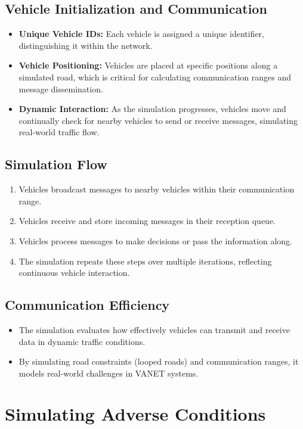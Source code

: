 \subsection{Vehicle Initialization and Communication}
\begin{itemize}
    \item \textbf{Unique Vehicle IDs:} Each vehicle is assigned a unique identifier, distinguishing it within the network.
    \item \textbf{Vehicle Positioning:} Vehicles are placed at specific positions along a simulated road, which is critical for calculating communication ranges and message dissemination.
    \item \textbf{Dynamic Interaction:} As the simulation progresses, vehicles move and continually check for nearby vehicles to send or receive messages, simulating real-world traffic flow.
\end{itemize}

\subsection{Simulation Flow}
\begin{enumerate}
    \item Vehicles broadcast messages to nearby vehicles within their communication range.
    \item Vehicles receive and store incoming messages in their reception queue.
    \item Vehicles process messages to make decisions or pass the information along.
    \item The simulation repeats these steps over multiple iterations, reflecting continuous vehicle interaction.
\end{enumerate}

\subsection{Communication Efficiency}
\begin{itemize}
    \item The simulation evaluates how effectively vehicles can transmit and receive data in dynamic traffic conditions.
    \item By simulating road constraints (looped roads) and communication ranges, it models real-world challenges in VANET systems.
\end{itemize}

\section{Simulating Adverse Conditions}

